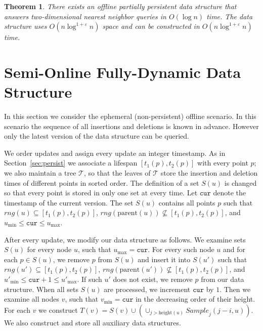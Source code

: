 \documentclass[12pt,a4paper,USenglish,cleveref, autoref, thm-restate]{article}
\newcommand{\Sample}{\mathit{Sample}}
\newcommand{\Sub}{\mathit{Sub}}
\newcommand{\cur}{\mathtt{cur}}
\newcommand{\oS}{\overline{S}}
\newcommand{\mcT}{\mathcal{T}}
\newcommand{\eps}{\varepsilon}
\newtheorem{theorem}{Theorem}
\newcommand{\Sample}{\mathit{Sample}}
\newcommand{\Sub}{\mathit{Sub}}
\newcommand{\cur}{\mathtt{cur}}
\newcommand{\oS}{\overline{S}}
\newcommand{\mcT}{\mathcal{T}}
\newcommand{\eps}{\varepsilon}
\newcommand{\Sample}{\mathit{Sample}}
\newcommand{\Sub}{\mathit{Sub}}
\newcommand{\cur}{\mathtt{cur}}
\newcommand{\oS}{\overline{S}}
\newcommand{\mcT}{\mathcal{T}}
\newcommand{\eps}{\varepsilon}
\begin{document}
\begin{theorem}
  \label{theor:persist}
  There exists an offline partially persistent data structure that answers two-dimensional nearest neighbor queries in $O(\log n)$ time. The data structure uses $O(n \log^{1+\eps} n)$ space and can be constructed in $O(n\log^{1+\eps}n)$ time. 
\end{theorem}

\section{Semi-Online Fully-Dynamic Data Structure}
\label{sec:offline}
In this section we consider the ephemeral (non-persistent) offline  scenario. In this scenario the sequence of all insertions and deletions is known in advance. However only the latest version of the data structure can be queried.

We order updates and assign every update an integer timestamp. As in Section~\ref{sec:persist} we associate a lifespan $[t_1(p),t_2(p)]$ with every point $p$; we also maintain a tree $\mcT$, so that the leaves of $\mcT$ store the insertion and deletion times of different points in sorted order.
The definition of a set $S(u)$ is changed so that every point is stored in only one set at every time.
Let $\cur$ denote the timestamp of the current version.  The set $S(u)$ contains all points $p$ such that
$rng(u)\subseteq [t_{1}(p),t_{2}(p)]$, $rng(\text{parent}(u))\not\subseteq [t_{1}(p),t_{2}(p)]$,
and $u_{\min}\le \cur \le u_{\max}$.

After every update, we modify our data structure as follows.
We examine sets $S(u)$ for every node $u$, such that $u_{\max}=\cur$. For every such node $u$ and for each $p\in S(u)$, we remove $p$ from $S(u)$ and insert it into $S(u')$ such that
$rng(u')\subseteq [t_{1}(p),t_{2}(p)]$, $rng(\text{parent}(u'))\not\subseteq [t_{1}(p),t_{2}(p)]$,
and $u'_{\min}\le \cur+1 \le u'_{\max}$.  If such $u'$ does not exist, we remove $p$ from our data structure.
When all sets $S(u)$ are processed, we increment $\cur$ by $1$.
Then we examine all nodes $v$, such that $v_{\min}=\cur$ in the decreasing order of their height.  For each $v$ we 
construct $T(v)=S(v)\cup (\cup_{j>\text{height}(u)} \Sample_j(j-i,u))$. We also construct  and store all auxiliary data structures. 
\end{document}
